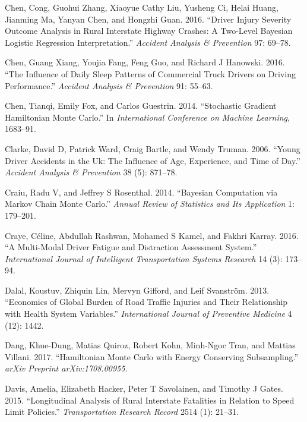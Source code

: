 \documentclass[12pt]{book}
\numberwithin{equation}{chapter}
\begin{document}
\leavevmode\hypertarget{ref-chen2016driver}{}%
Chen, Cong, Guohui Zhang, Xiaoyue Cathy Liu, Yusheng Ci, Helai Huang, Jianming Ma, Yanyan Chen, and Hongzhi Guan. 2016. ``Driver Injury Severity Outcome Analysis in Rural Interstate Highway Crashes: A Two-Level Bayesian Logistic Regression Interpretation.'' \emph{Accident Analysis \& Prevention} 97: 69--78.

\leavevmode\hypertarget{ref-chen2016influence}{}%
Chen, Guang Xiang, Youjia Fang, Feng Guo, and Richard J Hanowski. 2016. ``The Influence of Daily Sleep Patterns of Commercial Truck Drivers on Driving Performance.'' \emph{Accident Analysis \& Prevention} 91: 55--63.

\leavevmode\hypertarget{ref-chen2014stochastic}{}%
Chen, Tianqi, Emily Fox, and Carlos Guestrin. 2014. ``Stochastic Gradient Hamiltonian Monte Carlo.'' In \emph{International Conference on Machine Learning}, 1683--91.

\leavevmode\hypertarget{ref-clarke2006young}{}%
Clarke, David D, Patrick Ward, Craig Bartle, and Wendy Truman. 2006. ``Young Driver Accidents in the Uk: The Influence of Age, Experience, and Time of Day.'' \emph{Accident Analysis \& Prevention} 38 (5): 871--78.

\leavevmode\hypertarget{ref-craiu2014bayesian}{}%
Craiu, Radu V, and Jeffrey S Rosenthal. 2014. ``Bayesian Computation via Markov Chain Monte Carlo.'' \emph{Annual Review of Statistics and Its Application} 1: 179--201.

\leavevmode\hypertarget{ref-craye2016multi}{}%
Craye, Céline, Abdullah Rashwan, Mohamed S Kamel, and Fakhri Karray. 2016. ``A Multi-Modal Driver Fatigue and Distraction Assessment System.'' \emph{International Journal of Intelligent Transportation Systems Research} 14 (3): 173--94.

\leavevmode\hypertarget{ref-dalal2013economics}{}%
Dalal, Koustuv, Zhiquin Lin, Mervyn Gifford, and Leif Svanström. 2013. ``Economics of Global Burden of Road Traffic Injuries and Their Relationship with Health System Variables.'' \emph{International Journal of Preventive Medicine} 4 (12): 1442.

\leavevmode\hypertarget{ref-dang2017hamiltonian}{}%
Dang, Khue-Dung, Matias Quiroz, Robert Kohn, Minh-Ngoc Tran, and Mattias Villani. 2017. ``Hamiltonian Monte Carlo with Energy Conserving Subsampling.'' \emph{arXiv Preprint arXiv:1708.00955}.

\leavevmode\hypertarget{ref-davis2015longitudinal}{}%
Davis, Amelia, Elizabeth Hacker, Peter T Savolainen, and Timothy J Gates. 2015. ``Longitudinal Analysis of Rural Interstate Fatalities in Relation to Speed Limit Policies.'' \emph{Transportation Research Record} 2514 (1): 21--31.
\end{document}
